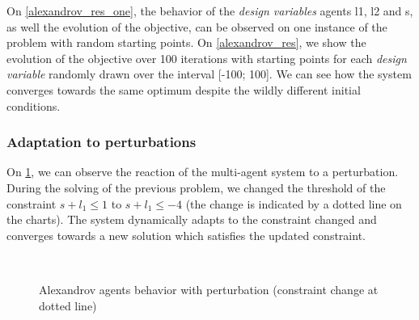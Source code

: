 On \figurename \ref{alexandrov_res_one}, the behavior of the \emph{design variables} agents l1, l2 and s, as well the evolution of the objective, can be observed on one instance of the problem with random starting points. On \figurename \ref{alexandrov_res}, we show the evolution of the objective over 100 iterations with  starting points  for each \emph{design variable} randomly drawn over the interval [-100; 100]. We can see how the system converges towards the same optimum despite the wildly different initial conditions.

\subsubsection*{Adaptation to perturbations}
 
On \figurename \ref{alexandrov_res_pert}, we can observe the reaction of the multi-agent system to a perturbation. During the solving of the previous problem, we changed the threshold of the constraint $s + l_1 \leq 1$ to $s + l_1 \leq -4$ (the change is indicated by a dotted line on the charts). The system dynamically adapts to the constraint changed and converges towards a new solution which satisfies the updated constraint.


\begin{figure}[h]
\centering

	\vspace{-20pt}
	\\
	
	\caption{Alexandrov agents behavior with perturbation (constraint change at dotted line)}
	\label{alexandrov_res_pert}

\end{figure}


